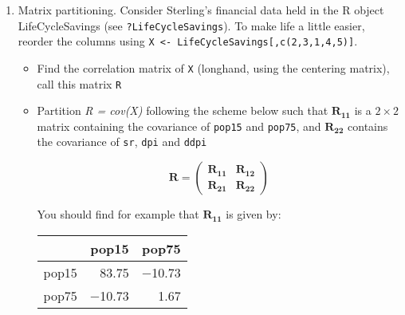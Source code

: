 \documentclass{article}
\begin{document}
\begin{enumerate}


\item Matrix partitioning.   Consider Sterling's financial data held in the R object LifeCycleSavings (see \texttt{?LifeCycleSavings}).   To make life a little easier, reorder the columns using \texttt{X <- LifeCycleSavings[,c(2,3,1,4,5)]}.

\begin{itemize}
\item Find the correlation matrix of \texttt{X} (longhand, using the centering matrix), call this matrix \texttt{R}


\item Partition \textit{R = cov(X)} following the scheme below such that $\boldsymbol{R_{11}}$ is a $2 \times 2$ matrix containing the covariance of \texttt{pop15} and \texttt{pop75}, and $\boldsymbol{R_{22}}$ contains the covariance of \texttt{sr}, \texttt{dpi} and \texttt{ddpi}

\begin{displaymath}
\boldsymbol{R} = \left( \begin{array}{l|l} \boldsymbol{R_{11}} & \boldsymbol{R_{12}} \\ \hline    \boldsymbol{R_{21}} & \boldsymbol{R_{22}} \end{array} \right) 
\end{displaymath}

You should find for example that  $\boldsymbol{R_{11}}$ is given by:
\begin{table}[ht]
\begin{center}
\begin{tabular}{rrr}
\hline
 & pop15 & pop75 \\
\hline
pop15 & 83.75 & $-$10.73 \\
pop75 & $-$10.73 & 1.67 \\
\hline
\end{tabular}
\end{center}
\end{table}


\end{itemize}
\end{enumerate}
\end{document}
